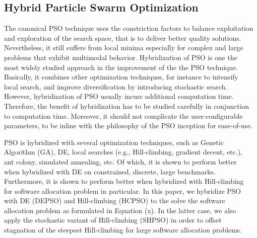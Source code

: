 \subsection{Hybrid Particle Swarm Optimization}
The canonical PSO technique uses the constriction factors to balance exploitation and exploration of the search space, that is to deliver better quality solutions. Nevertheless, it still suffers from local minima especially for complex and large problems that exhibit multimodal behavior. Hybridization of PSO is one the most widely studied approach in the improvement of the the PSO technique. Basically, it combines other optimization techniques, for instance to intensify local search, and improve diversification by introducing stochastic search. However, hybridization of PSO usually incurs additional computation time. Therefore, the benefit of hybridization has to be studied carefully in conjunction to computation time. Moreover, it should not complicate the user-configurable parameters, to be inline with the philosophy of the PSO inception for ease-of-use.

PSO is hybridized with several optimization techniques, such as Genetic Algorithm (GA), DE, local searches (e.g., Hill-climbing, gradient decent, etc.), ant colony, simulated annealing, etc. Of which, it is shown to perform better when hybridized with DE on constrained, discrete, large benchmarks. Furthermore, it is shown to perform better when hybridized with Hill-climbing for software allocation problem \cite{} in particular. In this paper, we hybridize PSO with DE (DEPSO) and Hill-climbing (HCPSO) to the solve the software allocation problem as formulated in Equation (x). In the latter case, we also apply the stochastic variant of Hill-climbing (SHPSO) in order to offset stagnation of the steepest Hill-climbing for large software allocation problems.

